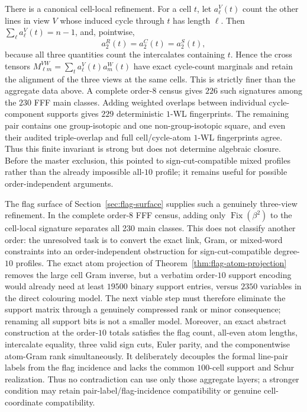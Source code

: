 There is a canonical cell-local refinement.  For a cell $t$, let
$a^V_\ell(t)$ count the other lines in view $V$ whose induced cycle through
$t$ has length $\ell$.  Then $\sum_\ell a^V_\ell(t)=n-1$, and, pointwise,
\[
 a^R_2(t)=a^C_2(t)=a^S_2(t),
\]
because all three quantities count the intercalates containing $t$.  Hence
the cross tensors
$M^{VW}_{\ell m}=\sum_t a^V_\ell(t)a^W_m(t)$ have exact cycle-count
marginals and retain the alignment of the three views at the same cells.
This is strictly finer than the aggregate data above.  A complete order-$8$
census gives $226$ such signatures among the $230$ FFF main classes.  Adding
weighted overlaps between individual cycle-component supports gives $229$
deterministic $1$-WL fingerprints.  The remaining pair contains one
group-isotopic and one non-group-isotopic square, and even their audited
triple-overlap and full cell/cycle-atom $1$-WL fingerprints agree.  Thus this
  finite invariant is strong but does not determine algebraic closure.  Before
the master exclusion, this pointed to sign-cut-compatible mixed profiles
rather than the already impossible all-$10$ profile; it remains useful for
possible order-independent arguments.

The flag surface of Section~\ref{sec:flag-surface} supplies such a genuinely
three-view refinement.  In the complete order-$8$ FFF census, adding only
$\operatorname{Fix}(\beta^2)$ to the cell-local signature separates all 230
main classes.  This does not classify another order: the unresolved task is
to convert the exact link, Gram, or mixed-word constraints into an
order-independent obstruction for sign-cut-compatible degree-$10$ profiles.
The exact atom projection of Theorem~\ref{thm:flag-atom-projection} removes
the large cell Gram inverse, but a verbatim order-$10$ support encoding would
already need at least $19500$ binary support entries, versus $2350$ variables
in the direct colouring model.  The next viable step must therefore eliminate
the support matrix through a genuinely compressed rank or minor consequence;
renaming all support bits is not a smaller model.
Moreover, an exact abstract construction at the order-$10$ totals satisfies
the flag count, all-even atom lengths, intercalate equality, three valid sign
cuts, Euler parity, and the componentwise atom-Gram rank simultaneously.
It deliberately decouples the formal line-pair labels from the flag
incidence and lacks the common $100$-cell support and Schur realization.
Thus no contradiction can use only those aggregate layers; a stronger
condition may retain pair-label/flag-incidence compatibility or genuine
cell-coordinate compatibility.

